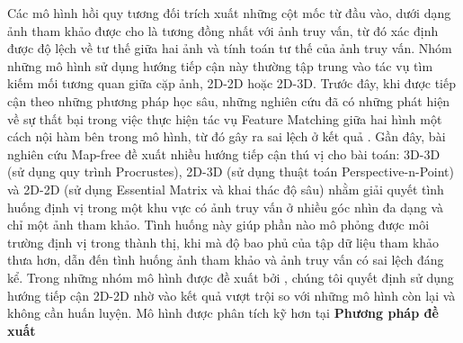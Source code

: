 Các mô hình hồi quy tương đối trích xuất những cột mốc từ đầu vào, dưới dạng ảnh tham khảo được cho là tương đồng nhất với ảnh truy vấn, từ đó xác định được độ lệch về tư thế giữa hai ảnh và tính toán tư thế của ảnh truy vấn. Nhóm những mô hình sử dụng hướng tiếp cận này thường tập trung vào tác vụ tìm kiếm mối tương quan giữa cặp ảnh, 2D-2D hoặc 2D-3D. Trước đây, khi được tiếp cận theo những phương pháp học sâu, những nghiên cứu đã có những phát hiện về sự thất bại trong việc thực hiện tác vụ Feature Matching giữa hai hình một cách nội hàm bên trong mô hình, từ đó gây ra sai lệch ở kết quả \cite{zhou2020learn}. Gần đây, bài nghiên cứu Map-free \cite{arnold2022mapfree} đề xuất nhiều hướng tiếp cận thú vị cho bài toán: 3D-3D (sử dụng quy trình Procrustes), 2D-3D (sử dụng thuật toán Perspective-n-Point) và 2D-2D (sử dụng Essential Matrix và khai thác độ sâu) nhằm giải quyết tình huống định vị trong một khu vực có ảnh truy vấn ở nhiều góc nhìn đa dạng và chỉ một ảnh tham khảo. Tình huống này giúp phần nào mô phỏng được môi trường định vị trong thành thị, khi mà độ bao phủ của tập dữ liệu tham khảo thưa hơn, dẫn đến tình huống ảnh tham khảo và ảnh truy vấn có sai lệch đáng kể. Trong những nhóm mô hình được đề xuất bởi \cite{arnold2022mapfree}, chúng tôi quyết định sử dụng hướng tiếp cận 2D-2D nhờ vào kết quả vượt trội so với những mô hình còn lại và không cần huấn luyện. Mô hình được phân tích kỹ hơn tại \textbf{Phương pháp đề xuất}





